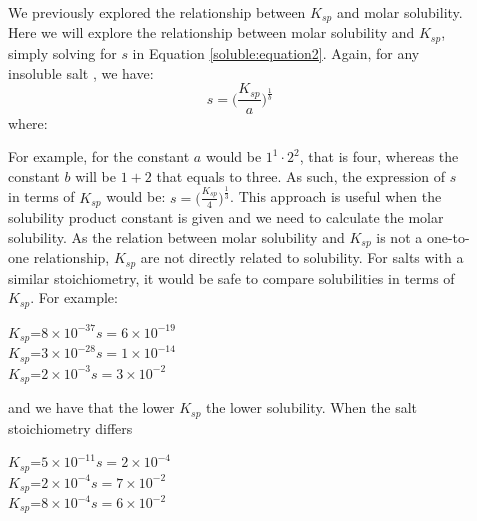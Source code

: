 \documentclass[main.tex]{subfiles}
\newcommand\chapterlabel{soluble}
\begin{document}
\begin{description}
\item[] We previously explored the relationship between $K_{sp}$ and molar solubility. Here we will explore the relationship between molar solubility and $K_{sp}$, simply solving for $s$ in Equation \ref{\chapterlabel:equation2}. Again, for any insoluble salt , we have:
\begin{equation}
\boxed{ s= \Big( \frac{K_{sp}}{a} \Big)^{\frac{1}{b}}  }\label{\chapterlabel:equation3}
\end{equation}
where:
For example, for  the constant $a$ would be $1^1\cdot 2^2$, that is four, whereas the constant $b$ will be $1+2$ that equals to three. As such, the expression of $s$ in terms of $K_{sp}$ would be: $s= \big( \frac{K_{sp}}{4} \big)^{\frac{1}{3}} $. This approach is useful when the solubility product constant is given and we need to calculate the molar solubility.
As the relation between molar solubility and $K_{sp}$ is not a one-to-one relationship, $K_{sp}$ are not directly related to solubility. For salts with a similar stoichiometry, it would be safe to compare solubilities in terms of $K_{sp}$. For example:
\begin{center}
	\hfill	$K_{sp}$=$8\times10^{-37}$\hfill$s=6\times10^{-19}$\\
	\hfill	$K_{sp}$=$3\times10^{-28}$\hfill$s=1\times10^{-14}$\\
	\hfill	$K_{sp}$=$2\times10^{-3}$\hfill$s=3\times10^{-2}$
\end{center}
and we have that the lower $K_{sp}$ the lower solubility. When the salt stoichiometry differs
\begin{center}
	\hfill	$K_{sp}$=$5\times10^{-11}$\hfill$s=2\times10^{-4}$\\
	\hfill	$K_{sp}$=$2\times10^{-4}$\hfill$s=7\times10^{-2}$\\
	\hfill	$K_{sp}$=$8\times10^{-4}$\hfill$s=6\times10^{-2}$\\

\end{center}
\end{description}
\end{document}
